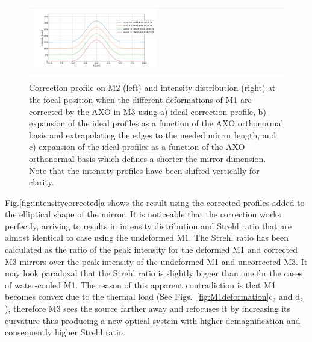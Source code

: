 \documentclass{iucr}              %
\begin{document}
\begin{figure}
\begin{center}
\begin{tabular}{l}
   \includegraphics[width=0.5\textwidth]{figures/intensitycorrectedcropped.png}\\

   \end{tabular}
   \end{center}
   \caption
   { 
Correction profile on M2 (left) and intensity distribution (right) at the focal position when the different deformations of M1 are corrected by the AXO in M3 using  a) ideal correction profile, b)  expansion of the ideal profiles as a function of the AXO orthonormal basis and extrapolating the edges to the needed mirror length, and c)  expansion of the ideal profiles as a function of the AXO orthonormal basis which defines a shorter the mirror dimension. Note that the intensity profiles have been shifted vertically for clarity. }
   \end{figure} 



Fig.\ref{fig:intensitycorrected}a shows the result using the corrected profiles added to the elliptical shape of the mirror. It is noticeable that the correction works perfectly, arriving to results in intensity distribution and Strehl ratio that are almost identical to case using the undeformed M1. The Strehl ratio has been calculated as the ratio of the peak intensity for the deformed M1 and corrected M3 mirrors over the peak intensity of the undeformed M1 and uncorrected M3. It may look paradoxal that the Strehl ratio is slightly bigger than one for the cases of water-cooled M1. The reason of this apparent contradiction is that M1 becomes convex due to the thermal load (See Figs.~\ref{fig:M1deformation}c$_2$ and d$_2$), therefore M3 sees the source farther away and refocuses it by increasing its curvature thus producing a new optical system with higher demagnification and consequently higher Strehl ratio.   
\end{document}
